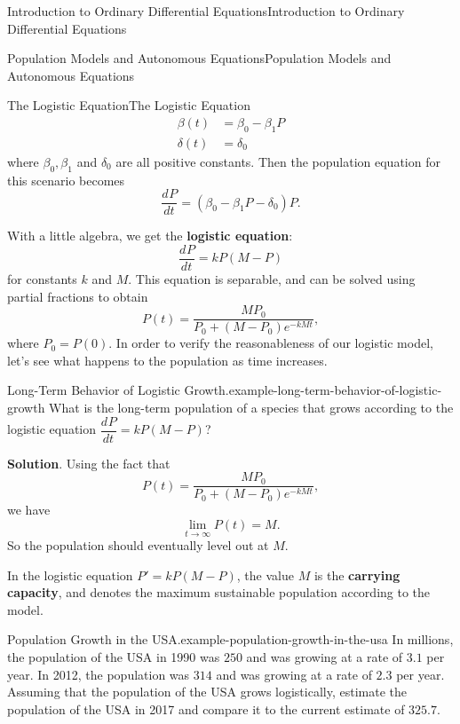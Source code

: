 \documentclass[10pt,]{book}
\newcommand{\terminology}[1]{\textbf{#1}}
\numberwithin{equation}{section}
\newcommand{\dv}[3][]{\dfrac{d^{#1} #2}{d #3^{#1}}}
\begin{document}
\begin{chapterptx}{Introduction to Ordinary Differential Equations}{}{Introduction to Ordinary Differential Equations}{}{}
\begin{sectionptx}{Population Models and Autonomous Equations}{}{Population Models and Autonomous Equations}{}{}
\begin{subsectionptx}{The Logistic Equation}{}{The Logistic Equation}{}{}
\begin{align*}
\beta(t) & = \beta_{0} - \beta_{1}P \\
\delta(t) & = \delta_{0} 
\end{align*}
where \(\beta_{0},\beta_{1}\) and \(\delta_{0}\) are all positive constants. Then the population equation for this scenario becomes%
\begin{equation*}
\dv{P}{t} = (\beta_{0} - \beta_{1}P - \delta_{0})P.
\end{equation*}
%
\par
\hypertarget{p-112}{}%
With a little algebra, we get the \terminology{logistic equation}:%
\begin{equation*}
\dv{P}{t} = kP(M-P)
\end{equation*}
for constants \(k\) and \(M\). This equation is separable, and can be solved using partial fractions to obtain%
\begin{equation*}
P(t) = \frac{MP_{0}}{P_{0} + (M - P_{0})e^{-kMt}},
\end{equation*}
where \(P_{0} = P(0)\). In order to verify the reasonableness of our logistic model, let's see what happens to the population as time increases.%
\begin{example}{Long-Term Behavior of Logistic Growth.}{example-long-term-behavior-of-logistic-growth}%
\hypertarget{p-113}{}%
What is the long-term population of a species that grows according to the logistic equation \(\dv{P}{t} = kP(M-P)\)?%
\par\smallskip%
\noindent\textbf{Solution}.\hypertarget{solution-18}{}\quad%
\hypertarget{p-114}{}%
Using the fact that%
\begin{equation*}
P(t) = \frac{MP_{0}}{P_{0} + (M - P_{0})e^{-kMt}},
\end{equation*}
we have%
\begin{equation*}
\lim_{t\to\infty}P(t) = M.
\end{equation*}
So the population should eventually level out at \(M\).%
\end{example}
\hypertarget{p-115}{}%
In the logistic equation \(P' = kP(M-P)\), the value \(M\) is the \terminology{carrying capacity}, and denotes the maximum sustainable population according to the model.%
\begin{example}{Population Growth in the USA.}{example-population-growth-in-the-usa}%
\hypertarget{p-116}{}%
In millions, the population of the USA in 1990 was \(250\) and was growing at a rate of \(3.1\) per year. In 2012, the population was \(314\) and was growing at a rate of \(2.3\) per year. Assuming that the population of the USA grows logistically, estimate the population of the USA in 2017 and compare it to the current estimate of \(325.7\).%

\end{example}
\end{subsectionptx}
\end{sectionptx}
\end{chapterptx}
\end{document}
